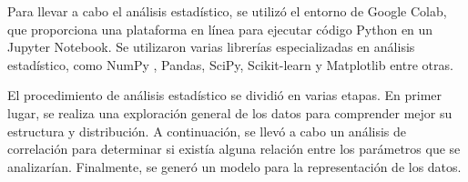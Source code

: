 Para llevar a cabo el análisis estadístico, se utilizó el entorno de Google Colab, que proporciona una plataforma en línea para ejecutar código Python en un Jupyter Notebook. Se utilizaron varias librerías especializadas en análisis estadístico, como NumPy \citep{harris2020array}, Pandas\citep{mckinney2010data}, SciPy\citep{2020SciPy-NMeth}, Scikit-learn\citep{scikit-learn} y Matplotlib\citep{Hunter2007} entre otras. 

El procedimiento de análisis estadístico se dividió en varias etapas. En primer lugar, se realiza una exploración general de los datos para comprender mejor su estructura y distribución. A continuación, se llevó a cabo un análisis de correlación para determinar si existía alguna relación entre los parámetros que se analizarían. Finalmente, se generó un modelo para la representación de los datos.